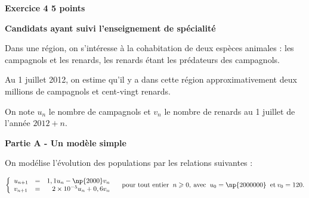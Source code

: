 \documentclass[10pt]{article}
\begin{document}
\textbf{Exercice 4 \hfill  5 points}

\textbf{Candidats ayant suivi l'enseignement de spécialité}

\medskip

Dans une région, on s'intéresse à la cohabitation de deux espèces animales : les campagnols et les
renards, les renards étant les prédateurs des campagnols. 

Au 1 juillet 2012, on estime qu'il y a dans cette région approximativement deux millions de campagnols et cent-vingt renards.

On note $u_n$ le nombre de campagnols et $v_n$ le nombre de renards au 1 juillet de l'année $2012+ n$.

\bigskip

\textbf{Partie A - Un modèle simple}

\medskip

On modélise l'évolution des populations par les relations suivantes :

\[\left\{\begin{array}{l c r}
u_{n+1}& =& 1,1u_n - \np{2000}v_n\\
v_{n+1} &=& 2 \times 10^{-5}u_n + 0,6v_n
\end{array}\right. \quad \text{pour tout entier }\:n \geqslant 0,\: \text{avec } \:u_0 = \np{2000000}\:  \text{ et} \: v_0 = 120.\]

\medskip
\end{document}
